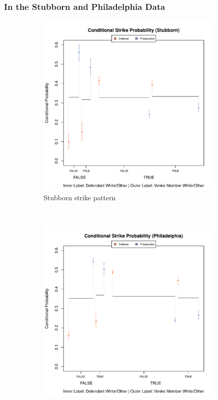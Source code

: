 \documentclass[12pt]{article}
\begin{document}
\subsubsection{In the Stubborn and Philadelphia Data}

\begin{figure}[h!]
  \centering
  \begin{subfigure}{0.32\textwidth}
    \includegraphics[scale = 0.32]{StubbornCompPlot}
    \caption{\footnotesize Stubborn strike pattern}
    \label{fig:stubcomp}
  \end{subfigure}
  ~
  \begin{subfigure}{0.32\textwidth}
    \includegraphics[scale = 0.32]{PhillyCompPlot}

\end{subfigure}
\end{figure}
\end{document}
